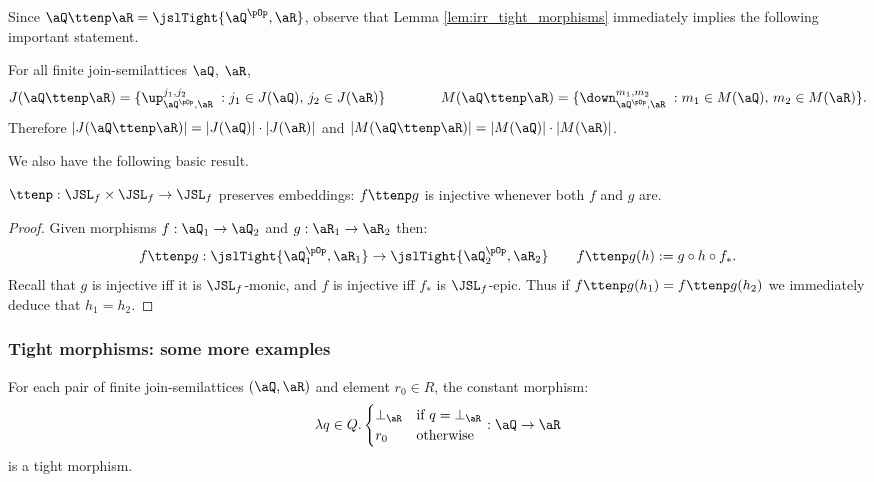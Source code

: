 \documentclass{article}
\begin{document}
Since $\aQ \ttenp \aR = \jslTight{\aQ^{\pOp},\aR}$, observe that Lemma \ref{lem:irr_tight_morphisms} immediately implies the following important statement.

\begin{lemma}
\label{lem:tight_tensor_irr}
\item
For all finite join-semilattices $\aQ$, $\aR$,
\[
J(\aQ \ttenp \aR) = \{ \up_{\aQ^{\pOp},\aR}^{j_1,j_2} \; : j_1 \in J(\aQ), \, j_2 \in J(\aR) \}
\qquad\qquad
M(\aQ \ttenp \aR) = \{ \down_{\aQ^{\pOp},\aR}^{m_1,m_2} \; : m_1 \in M(\aQ), \, m_2 \in M(\aR) \}.
\]
Therefore $|J(\aQ \ttenp \aR)| = |J(\aQ)| \cdot |J(\aR)|$ and $|M(\aQ \ttenp \aR)| = |M(\aQ)| \cdot |M(\aR)|$.
\end{lemma}

\smallskip
We also have the following basic result.

\begin{lemma}
\label{lem:ttenp_pres_monos}
$\ttenp : \JSL_f \times \JSL_f \to \JSL_f$ preserves embeddings: $f \ttenp g$ is injective whenever both $f$ and $g$ are.
\end{lemma}

\begin{proof}
Given morphisms $f : \aQ_1 \to \aQ_2$ and $g : \aR_1 \to \aR_2$ then:
\[
f \ttenp g : \jslTight{\aQ_1^{\pOp},\aR_1} \to \jslTight{\aQ_2^{\pOp},\aR_2}
\qquad
f \ttenp g(h) := g \circ h \circ f_*.
\]
Recall that $g$ is injective iff it is $\JSL_f$-monic, and $f$ is injective iff $f_*$ is $\JSL_f$-epic. Thus if $f \ttenp g(h_1) = f \ttenp g(h_2)$ we immediately deduce that $h_1 = h_2$.
\end{proof}


\takeout{
\[
\begin{tabular}{c}
$\beta_{\aQ \otimes \aR} : Q \times R \to O(\Pirr\aQ \syncp \Pirr\aR)$
\\[0.5ex]
where $\beta_{\aQ \otimes \aR}(q,r) := \{ (m_q,m_r) \in M(\aQ) \times M(\aR) : q \nleq_\aQ m_q \text{ and } r \nleq_\aR m_r \}$
\end{tabular}
\]
}

\subsubsection{Tight morphisms: some more examples}

\begin{lemma}
\label{lem:const_mor_are_tight}
\item
For each pair of finite join-semilattices $(\aQ,\aR)$ and element $r_0 \in R$, the constant morphism:
\[
\lambda q \in Q. 
\begin{cases}
\bot_\aR & \text{if $q = \bot_\aR$}
\\
r_0 & \text{otherwise}
\end{cases} : \aQ \to \aR
\]
is a tight morphism.
\end{lemma}
\end{document}
